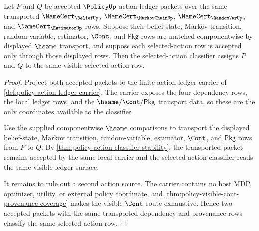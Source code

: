 \begin{theorem}
\label{thm:policy-selected-action-determinacy}
Let $P$ and $Q$ be accepted $\PolicyUp$ action-ledger packets over the same
transported $\NameCert_{\BeliefUp}$, $\NameCert_{\MarkovChainUp}$,
$\NameCert_{\RandomVarUp}$, and $\NameCert_{\EstimatorUp}$ rows. Suppose their
belief-state, Markov transition, random-variable, estimator, $\Cont$, and
$\mathsf{Pkg}$ rows are matched componentwise by displayed $\hsame$ transport,
and suppose each selected-action row is accepted only through those displayed
rows. Then the selected-action classifier assigns $P$ and $Q$ to the same
visible selected-action row.
\end{theorem}
\begin{proof}
Project both accepted packets to the finite action-ledger carrier of
\autoref{def:policy-action-ledger-carrier}. The carrier exposes the four
dependency rows, the local ledger rows, and the $\hsame/\Cont/\mathsf{Pkg}$
transport data, so these are the only coordinates available to the classifier.

Use the supplied componentwise $\hsame$ comparisons to transport the displayed
belief-state, Markov transition, random-variable, estimator, $\Cont$, and
$\mathsf{Pkg}$ rows from $P$ to $Q$. By
\autoref{thm:policy-action-classifier-stability}, the transported packet remains
accepted by the same local carrier and the selected-action classifier reads the
same visible ledger surface.

It remains to rule out a second action source. The carrier contains no host MDP,
optimizer, utility, or external policy coordinate, and
\autoref{thm:policy-visible-cont-provenance-coverage} makes the visible
$\Cont$ route exhaustive. Hence two accepted packets with the same transported
dependency and provenance rows classify the same selected-action row.
\end{proof}

